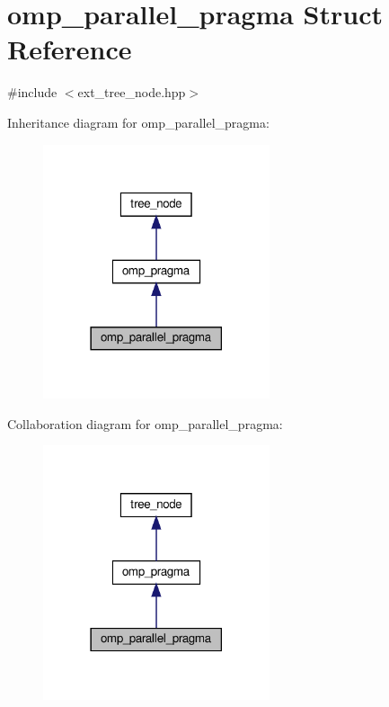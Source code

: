 \hypertarget{structomp__parallel__pragma}{}\section{omp\+\_\+parallel\+\_\+pragma Struct Reference}
\label{structomp__parallel__pragma}


{\ttfamily \#include $<$ext\+\_\+tree\+\_\+node.\+hpp$>$}



Inheritance diagram for omp\+\_\+parallel\+\_\+pragma\+:
\nopagebreak
\begin{figure}[H]
\begin{center}
\leavevmode
\includegraphics[width=189pt]{d9/d81/structomp__parallel__pragma__inherit__graph}
\end{center}
\end{figure}


Collaboration diagram for omp\+\_\+parallel\+\_\+pragma\+:
\nopagebreak
\begin{figure}[H]
\begin{center}
\leavevmode
\includegraphics[width=189pt]{d4/de0/structomp__parallel__pragma__coll__graph}
\end{center}
\end{figure}

